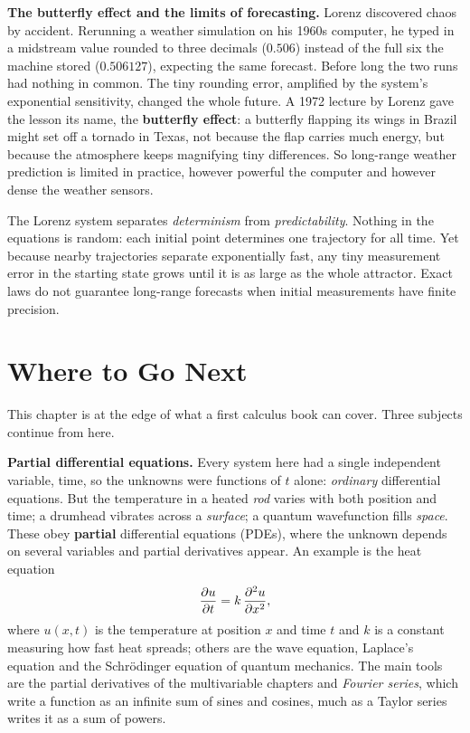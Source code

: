 \begin{applicationbox}
\textbf{The butterfly effect and the limits of forecasting.} Lorenz discovered
chaos by accident. Rerunning a weather simulation on his 1960s computer, he
typed in a midstream value rounded to three decimals ($0.506$) instead of the
full six the machine stored ($0.506127$), expecting the same forecast.
Before long the two runs had nothing in
common. The tiny rounding error, amplified by the system's exponential
sensitivity, changed the whole future. A 1972 lecture by Lorenz gave the lesson its
name, the \textbf{butterfly effect}: a butterfly flapping its wings in Brazil might set off a tornado in
Texas, not because the flap carries much energy, but because the atmosphere
keeps magnifying tiny differences. So long-range weather prediction is
limited in practice, however powerful the computer and however
dense the weather sensors.
\end{applicationbox}

\begin{aestheticbox}
The Lorenz system separates \emph{determinism} from \emph{predictability}. Nothing in the
equations is random: each initial point determines one trajectory for all time.
Yet because nearby trajectories separate exponentially fast, any tiny measurement error
in the starting state grows until it is as large as the whole attractor. Exact laws do not guarantee
long-range forecasts when initial measurements have finite precision.
\end{aestheticbox}

\section{Where to Go Next}
\label{ch39:next}

This chapter is at the edge of what a first calculus book can cover. Three
subjects continue from here.

\textbf{Partial differential equations.} Every system here had a single
independent variable, time, so the unknowns were functions of $t$ alone:
\emph{ordinary} differential equations. But the temperature in a heated \emph{rod}
varies with both position and time; a drumhead vibrates across a \emph{surface};
a quantum wavefunction fills \emph{space}. These obey \textbf{partial}
differential equations (PDEs), where the unknown depends on several variables and
partial derivatives appear. An example is the heat equation
\[
  \frac{\partial u}{\partial t} = k\,\frac{\partial^2 u}{\partial x^2},
\]
where $u(x,t)$ is the temperature at position $x$ and time $t$ and $k$ is a
constant measuring how fast heat spreads; others are the wave equation,
Laplace's equation and the Schr\"odinger equation of quantum mechanics. The
main tools are the partial derivatives of the multivariable
chapters and \emph{Fourier series}, which write a function as an infinite sum
of sines and cosines, much as a Taylor series writes it as a sum of powers.

